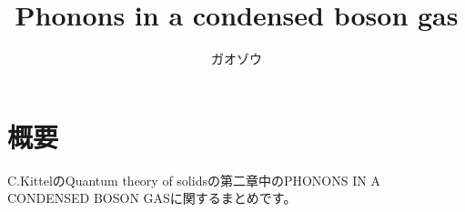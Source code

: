 \documentclass[uplatex,dvipdfmx]{jsarticle}
\title{Phonons in a condensed boson gas}
\author{ガオゾウ}
\begin{document}
\maketitle
\section{概要}
C.KittelのQuantum theory of solidsの第二章中のPHONONS IN A CONDENSED BOSON GASに関するまとめです。
\end{document}
